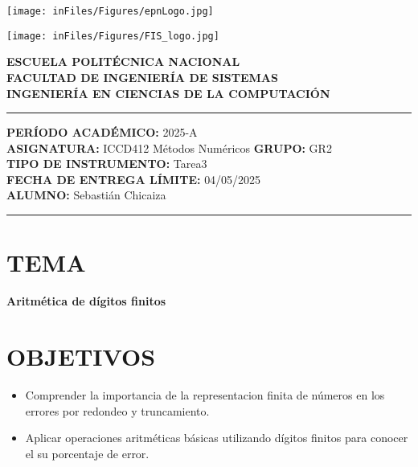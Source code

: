 \documentclass[12pt]{article}
\begin{document}
\begin{minipage}{0.45\textwidth}
    \texttt{[image: inFiles/Figures/epnLogo.jpg]}
\end{minipage}
\hfill
\begin{minipage}{0.45\textwidth}
    \raggedleft
    \texttt{[image: inFiles/Figures/FIS\_logo.jpg]}
\end{minipage}

\vspace{0.5cm}

\begin{center}
    \textbf{ESCUELA POLITÉCNICA NACIONAL}\\[0.2cm]
    \textbf{FACULTAD DE INGENIERÍA DE SISTEMAS}\\[0.2cm]
    \textbf{INGENIERÍA EN CIENCIAS DE LA COMPUTACIÓN}
\end{center}

\vspace{0.5cm}
\hrule
\vspace{0.5cm}

\noindent\textbf{PERÍODO ACADÉMICO:} 2025-A\\[0.2cm]
\noindent\textbf{ASIGNATURA:} ICCD412 Métodos Numéricos \hfill \textbf{GRUPO:} GR2\\[0.2cm]
\noindent\textbf{TIPO DE INSTRUMENTO:} Tarea3\\[0.2cm]
\noindent\textbf{FECHA DE ENTREGA LÍMITE:} {04/05/2025}\\[0.2cm]
\noindent\textbf{ALUMNO:} {Sebastián Chicaiza}

\vspace{0.5cm}
\hrule
\vspace{1cm}


\section*{TEMA}

\begin{center}
    \Large\textbf{Aritmética de dígitos finitos}
\end{center}
\vspace{0.5cm}

\section*{OBJETIVOS}
\begin{itemize}
    \item {Comprender la importancia de la representacion finita de números en los errores por redondeo y truncamiento.}
    \item {Aplicar operaciones aritméticas básicas utilizando dígitos finitos para conocer el su porcentaje de error.}
\end{itemize}
\end{document}
